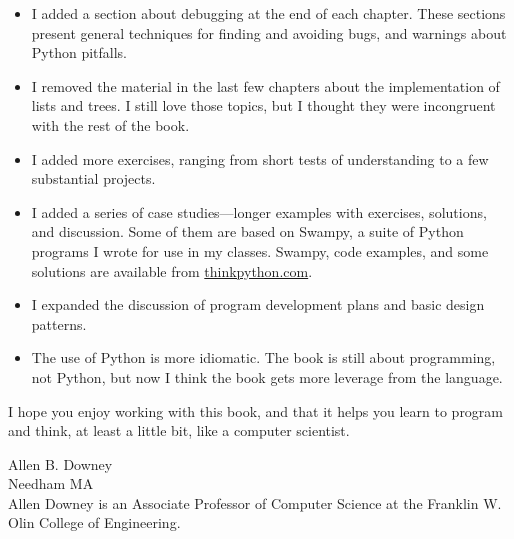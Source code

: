 \documentclass[10pt]{book}
\begin{document}
\begin{itemize}

\item I added a section about debugging at the end of each chapter.
  These sections present general techniques for finding and avoiding
  bugs, and warnings about Python pitfalls.

\item I removed the material in the last few chapters about the
  implementation of lists and trees.  I still love those topics, but I
  thought they were incongruent with the rest of the book.

\item I added more exercises, ranging from short tests of
  understanding to a few substantial projects.

\item I added a series of case studies---longer examples with
  exercises, solutions, and discussion.  Some of them are based on
  Swampy, a suite of Python programs I wrote for use in my classes.
  Swampy, code examples, and some solutions are available from
  \url{thinkpython.com}.
  
\item I expanded the discussion of program development plans
  and basic design patterns.

\item The use of Python is more idiomatic.  The book is still about
  programming, not Python, but now I think the book gets more leverage
  from the language.

\end{itemize}

I hope you enjoy working with this book, and that it helps
you learn to program and think, at least a little bit, like
a computer scientist.


Allen B. Downey \\
Needham MA\\

Allen Downey is an Associate Professor of Computer Science at 
the Franklin W. Olin College of Engineering.






\end{document}
